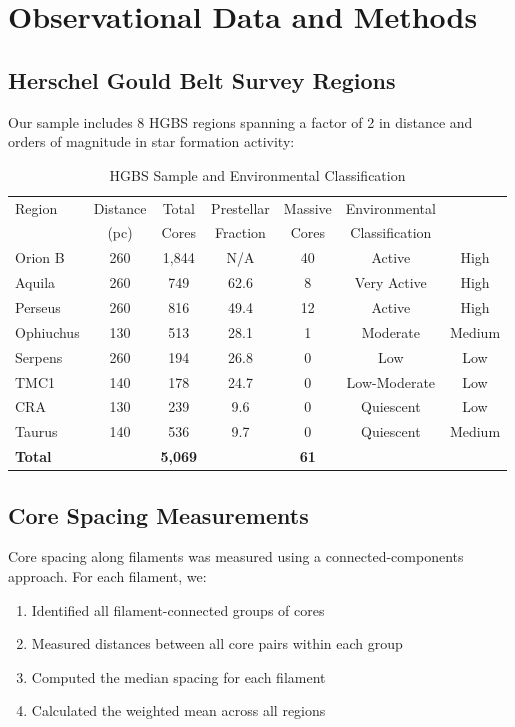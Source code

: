 \documentclass[11pt,a4paper]{article}
\begin{document}
\section{Observational Data and Methods}

\subsection{Herschel Gould Belt Survey Regions}

Our sample includes 8 HGBS regions spanning a factor of 2 in distance and orders of magnitude in star formation activity:

\begin{table}[H]
\centering
\caption{HGBS Sample and Environmental Classification}
\begin{tabular}{lcccccc}
\toprule
Region & Distance & Total & Prestellar & Massive & Environmental \\
       & (pc)   & Cores & Fraction & Cores & Classification \\
\midrule
Orion B  & 260     & 1,844 & N/A    & 40    & Active      & High   \\
Aquila   & 260     & 749   & 62.6   & 8     & Very Active & High   \\
Perseus  & 260     & 816   & 49.4   & 12    & Active      & High   \\
Ophiuchus& 130     & 513   & 28.1   & 1     & Moderate    & Medium \\
Serpens  & 260     & 194   & 26.8   & 0     & Low         & Low    \\
TMC1     & 140     & 178   & 24.7   & 0     & Low-Moderate & Low    \\
CRA      & 130     & 239   & 9.6    & 0     & Quiescent   & Low    \\
Taurus   & 140     & 536   & 9.7    & 0     & Quiescent   & Medium \\
\midrule
\textbf{Total} &        & \textbf{5,069} &        & \textbf{61} &            &        \\
\bottomrule
\end{tabular}
\end{table}

\subsection{Core Spacing Measurements}

Core spacing along filaments was measured using a connected-components approach. For each filament, we:
\begin{enumerate}
    \item Identified all filament-connected groups of cores
    \item Measured distances between all core pairs within each group
    \item Computed the median spacing for each filament
    \item Calculated the weighted mean across all regions
\end{enumerate}
\end{document}
